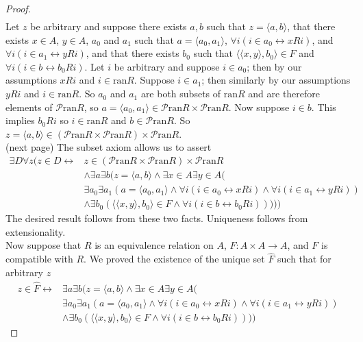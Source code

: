 \documentclass{report}
\begin{document}
\begin{proof}
\begin{align*}
\end{align*}
Let $z$ be arbitrary and suppose there exists $a,b$ such that $z=\langle a,b\rangle$, that there exists $x\in A$, $y\in A$, $a_0$ and $a_1$
such that $a=\langle a_0,a_1\rangle$, $\forall i(i\in a_0\leftrightarrow xRi)$, and $\forall i(i\in a_1\leftrightarrow yRi)$, and that there exists $b_0$ such that 
$\langle\langle x,y\rangle,b_0\rangle\in F$ and $\forall i(i\in b\leftrightarrow b_0Ri)$.
Let $i$ be arbitrary and suppose $i\in a_0$; then by our assumptions $xRi$ and $i\in\text{ran}R$.
Suppose $i\in a_1$; then similarly by our assumptions $yRi$ and $i\in\text{ran}R$. So $a_0$ and $a_1$ are both subsets of $\text{ran}R$ and are therefore elements of $\mathscr P\text{ran}R$, so
$a=\langle a_0,a_1\rangle\in\mathscr P\text{ran}R\times\mathscr P\text{ran}R$. Now suppose $i\in b$. This implies $b_0Ri$ so $i\in\text{ran}R$ and $b\in\mathscr P\text{ran}R$. 
So $z=\langle a,b\rangle\in(\mathscr P\text{ran}R\times\mathscr P\text{ran}R)\times\mathscr P\text{ran}R$.\\
(next page)\newpage
The subset axiom allows us to assert
\begin{align*}
\exists D\forall z(z\in D\leftrightarrow&z\in(\mathscr P\text{ran}R\times\mathscr P\text{ran}R)\times\mathscr P\text{ran}R\\
&\land\exists a\exists b(z=\langle a,b\rangle\land\exists x\in A\exists y\in A(\\&\exists a_0\exists a_1(a=\langle a_0,a_1\rangle\land\forall i(i\in a_0\leftrightarrow xRi)
\land\forall i(i\in a_1\leftrightarrow yRi))\\
&\land\exists b_0(\langle\langle x,y\rangle,b_0\rangle\in F\land\forall i(i\in b\leftrightarrow b_0Ri)))))
\end{align*}
The desired result follows from these two facts. Uniqueness follows from extensionality.\\
\indent Now suppose that $R$ is an equivalence relation on $A$, $F:A\times A\to A$, and $F$ is compatible with $R$. We proved the existence of the unique set $\hat F$ such that for arbitrary $z$
\begin{align*}
z\in \hat F\leftrightarrow&\exists a\exists b(z=\langle a,b\rangle\land\exists x\in A\exists y\in A(\\&\exists a_0\exists a_1(a=\langle a_0,a_1\rangle\land\forall i(i\in a_0\leftrightarrow xRi)
\land\forall i(i\in a_1\leftrightarrow yRi))\\
&\land\exists b_0(\langle\langle x,y\rangle,b_0\rangle\in F\land\forall i(i\in b\leftrightarrow b_0Ri))))

\end{align*}
\end{proof}
\end{document}
